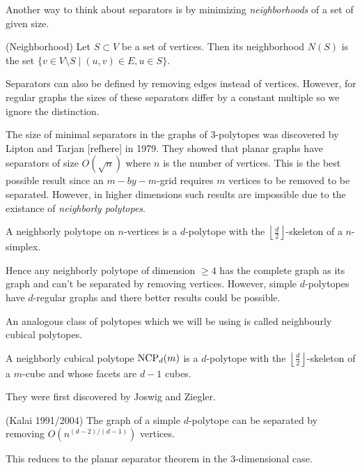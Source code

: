 Another way to think about separators is by minimizing \textit{neighborhoods} 
of a set of given size.

\begin{definition}
 (Neighborhood) Let $S \subset V$ be a set of vertices. Then its neighborhood 
$N(S)$ is the set $\{v \in V\setminus S \mid (u,v) \in E, u \in S\}$. 
\end{definition}


Separators can also be defined by removing edges instead of vertices. However, 
for regular graphs the sizes of these separators differ by a constant multiple 
so we ignore the distinction.

The size of minimal separators in the graphs of 3-polytopes was discovered by 
Lipton and Tarjan [refhere] in 1979. They showed that planar graphs have 
separators of size $O(\sqrt{n})$ where $n$ is the number of vertices. This is 
the best possible result since an $m-by-m$-grid requires $m$ vertices to be 
removed to be separated. However, in higher dimensions such results are 
impossible due to the existance of \textit{neighborly polytopes}.

\begin{definition}
 A neighborly polytope on $n$-vertices is a $d$-polytope with the $\left\lfloor 
\frac{d}{2} \right\rfloor$-skeleton of a $n$-simplex.
\end{definition}

Hence any neighborly polytope of dimension $\geq 4$ has the complete graph as 
its graph and can't be separated by removing vertices. However, simple 
$d$-polytopes have $d$-regular graphs and there better results could be 
possible. 

An analogous class of polytopes which we will be using is called neighbourly 
cubical polytopes. 

\begin{definition}
 A neighborly cubical polytope $\textrm{NCP}_d(m)$ is a $d$-polytope with the 
$\left\lfloor \frac{d}{2} 
\right\rfloor$-skeleton of a $m$-cube and whose facets are $d-1$ cubes.
\end{definition}

They were first discovered by Joswig and Ziegler.

\begin{conjecture}
 (Kalai 1991/2004) The graph of a simple $d$-polytope can be separated by 
removing $O(n^{(d-2)/(d-1)})$ vertices. 
\end{conjecture}

This reduces to the planar separator theorem in the 3-dimensional case. 

